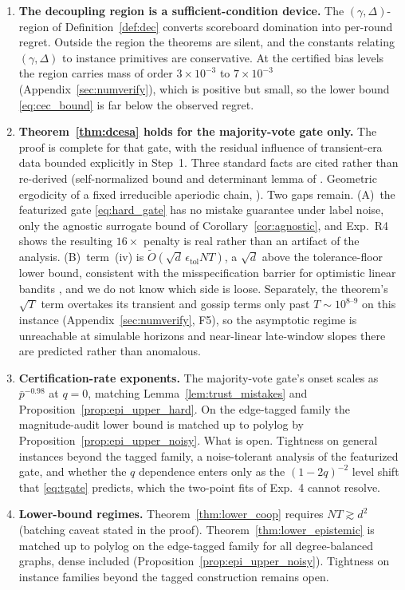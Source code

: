 \documentclass[11pt]{article}
\newcommand{\Ot}{\widetilde{O}}
\begin{document}
\begin{enumerate}[C1.]
\item \textbf{The decoupling region is a sufficient-condition
device.}  The $(\gamma,\Delta)$-region of Definition~\ref{def:dec}
converts scoreboard domination into per-round regret. Outside the
region the theorems are silent, and the constants relating
$(\gamma,\Delta)$ to instance primitives are conservative. At the
certified bias levels the region carries mass of order
$3\times10^{-3}$ to $7\times10^{-3}$
(Appendix~\ref{sec:numverify}), which is positive but small, so the
lower bound \eqref{eq:cec_bound} is far below the observed regret.

\item \textbf{Theorem~\ref{thm:dcesa} holds for the majority-vote
gate only.}
The proof is complete for that gate, with the residual influence of
transient-era data bounded explicitly in Step~1. Three standard facts
are cited rather than re-derived (self-normalized bound and
determinant lemma of \citet{abbasi2011}. Geometric ergodicity of a
fixed irreducible aperiodic chain, \citet{levin2017}).  Two gaps
remain. (A)~the featurized gate \eqref{eq:hard_gate} has no mistake
guarantee under label noise, only the agnostic surrogate bound of
Corollary~\ref{cor:agnostic}, and Exp.~R4 shows the resulting
$16\times$ penalty is real rather than an artifact of the analysis.
(B)~term~(iv) is $\Ot(\sqrt d\,\epsilon_{\mathrm{tol}}NT)$, a
$\sqrt d$ above the tolerance-floor lower bound, consistent with the
misspecification barrier for optimistic linear bandits
\citep{lattimore2020}, and we do not know which side is loose.
Separately, the theorem's $\sqrt T$ term overtakes its transient and
gossip terms only past $T\sim10^{8\text{--}9}$ on this instance
(Appendix~\ref{sec:numverify}, F5), so the asymptotic regime is
unreachable at simulable horizons and near-linear late-window slopes
there are predicted rather than anomalous.

\item \textbf{Certification-rate exponents.}
The majority-vote gate's onset scales as $\bar p^{-0.98}$ at $q=0$,
matching Lemma~\ref{lem:trust_mistakes} and
Proposition~\ref{prop:epi_upper_hard}. On the edge-tagged family the
magnitude-audit lower bound is matched up to polylog by
Proposition~\ref{prop:epi_upper_noisy}.  What is open. Tightness on
general instances beyond the tagged family, a noise-tolerant analysis
of the featurized gate, and whether the $q$ dependence enters only as
the $(1-2q)^{-2}$ level shift that \eqref{eq:tgate} predicts, which
the two-point fits of Exp.~4 cannot resolve.

\item \textbf{Lower-bound regimes.}  Theorem~\ref{thm:lower_coop}
requires $NT\gtrsim d^2$ (batching caveat stated in the proof). Theorem~\ref{thm:lower_epistemic} is matched up to polylog on the
edge-tagged family for all degree-balanced graphs, dense included
(Proposition~\ref{prop:epi_upper_noisy}). Tightness on instance
families beyond the tagged construction remains open.
\end{enumerate}
\end{document}
